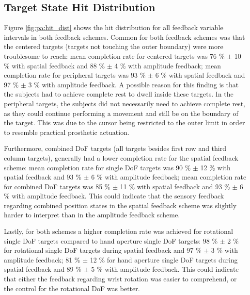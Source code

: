 \subsection{Target State Hit Distribution}
Figure \ref{fig:pa:hit_dist} shows the hit distribution for all feedback variable intervals in both feedback schemes. Common for both feedback schemes was that the centered  targets (targets not touching the outer boundary) were more troublesome to reach: mean completion rate for centered targets was 76 \% $\pm$ 10 \% with spatial feedback and 88 \%  $\pm$ 4 \% with amplitude feedback; mean completion rate for peripheral targets was 93 \% $\pm$ 6 \% with spatial feedback and 97 \% $\pm$ 3 \% with amplitude feedback.
A possible reason for this finding is that the subjects had to achieve complete rest to dwell inside these targets. In the peripheral targets, the subjects did not necessarily need to achieve complete rest, as they could continue performing a movement and still be on the boundary of the target. This was due to the cursor being restricted to the outer limit in order to resemble practical prosthetic actuation.  

Furthermore, combined DoF targets (all targets besides first row and third column targets), generally had a lower completion rate for the spatial feedback scheme: mean completion rate for single DoF targets was 90 \% $\pm$ 12 \% with spatial feedback and 93 \% $\pm$ 6 \% with amplitude feedback; mean completion rate for combined DoF targets was 85 \% $\pm$ 11 \% with spatial feedback and 93 \% $\pm$ 6 \% with amplitude feedback. This could indicate that the sensory feedback regarding combined position states in the spatial feedback scheme was slightly harder to interpret than in the amplitude feedback scheme. 

Lastly, for both schemes a higher completion rate was achieved for rotational single DoF targets compared to hand aperture single DoF targets: 98 \% $\pm$ 2 \% for rotational single DoF targets during spatial feedback and 97 \% $\pm$ 3 \% with amplitude feedback; 81 \% $\pm$ 12 \% for hand aperture single DoF targets during spatial feedback and 89 \% $\pm$ 5 \% with amplitude feedback. This could indicate that either the feedback regarding wrist rotation was easier to comprehend, or the control for the rotational DoF was better.
